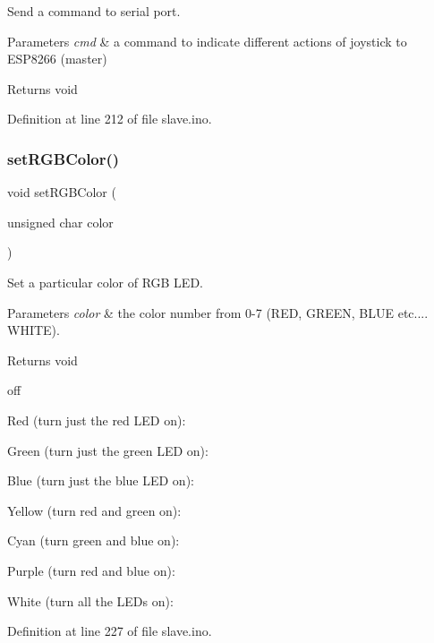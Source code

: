 Send a command to serial port. 


\begin{DoxyParams}{Parameters}
{\em cmd} & a command to indicate different actions of joystick to E\+S\+P8266 (master) \\
\hline
\end{DoxyParams}
\begin{DoxyReturn}{Returns}
void 
\end{DoxyReturn}


Definition at line 212 of file slave.\+ino.

\mbox{\label{slave_8ino_a1838aedbd7c80d2e66f6edf920484f72}} 
\subsubsection{\texorpdfstring{setRGBColor()}{setRGBColor()}}
{\footnotesize\ttfamily void set\+R\+G\+B\+Color (\begin{DoxyParamCaption}\item[{unsigned char}]{color }\end{DoxyParamCaption})}



Set a particular color of R\+GB L\+ED. 


\begin{DoxyParams}{Parameters}
{\em color} & the color number from 0-\/7 (R\+ED, G\+R\+E\+EN, B\+L\+UE etc.... W\+H\+I\+TE). \\
\hline
\end{DoxyParams}
\begin{DoxyReturn}{Returns}
void 
\end{DoxyReturn}
off

Red (turn just the red L\+ED on)\+:

Green (turn just the green L\+ED on)\+:

Blue (turn just the blue L\+ED on)\+:

Yellow (turn red and green on)\+:

Cyan (turn green and blue on)\+:

Purple (turn red and blue on)\+:

White (turn all the L\+E\+Ds on)\+: 

Definition at line 227 of file slave.\+ino.

\mbox{\label{slave_8ino_a4fc01d736fe50cf5b977f755b675f11d}} 
